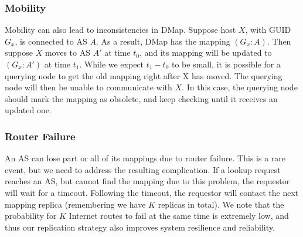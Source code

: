 
\subsubsection{Mobility} Mobility can also lead to inconsistencies in DMap. Suppose host $X$, with GUID $G_x$, is connected to AS $A$. As a result, DMap has the mapping $(G_x : A)$. Then suppose $X$ moves to AS $A'$ at time $t_0$, and its mapping will be updated to  $(G_x : A')$ at time $t_1$.  While we expect $t_1-t_0$ to be small, it is possible for a querying node to get the old mapping right after X has moved.  The querying node will then be unable to communicate with $X$.
In this case, the querying node should mark the mapping as obsolete, and 
keep checking until it receives an updated one.

\subsubsection{Router Failure} An AS can lose part or all of its mappings due to router failure. This is a rare event, but we need to address the resulting complication.  If a lookup request reaches an AS, but cannot find the mapping due to this problem, the requestor will wait for a timeout. Following the timeout, the requestor will contact the next mapping replica (remembering we have $K$ replicas in total). We note that the probability for $K$ Internet routes to fail at the same time is extremely low, and thus our replication strategy also improves system resilience and reliability.
